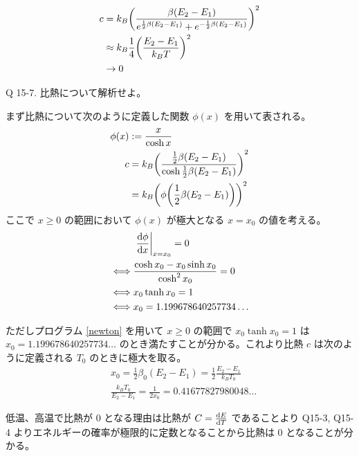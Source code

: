 \documentclass[uplatex,dvipdfmx,a4paper,11pt]{jlreq}
\theoremstyle{definition}
\begin{document}
\begin{align}
  c & = k_B\qty(\frac{\beta(E_2 - E_1)}{e^{\frac{1}{2}\beta(E_2 - E_1)} + e^{-\frac{1}{2}\beta(E_2 - E_1)}})^2                                                                                                                                                                                     \\
    & \approx k_B\frac{1}{4}\qty(\frac{E_2 - E_1}{k_BT})^2                                                                                                                                                                                                                                         \\
    & \to 0
\end{align}

\begin{itembox}[l]{Q 15-7.}
  比熱について解析せよ。
\end{itembox}

まず比熱について次のように定義した関数 $\phi(x)$ を用いて表される。
\begin{align}
  \phi(x) & := \frac{x}{\cosh x}                                                              \\
  c       & = k_B\qty(\frac{\frac{1}{2}\beta(E_2 - E_1)}{\cosh\frac{1}{2}\beta(E_2 - E_1)})^2 \\
          & = k_B\qty(\phi\qty(\frac{1}{2}\beta(E_2 - E_1)))^2
\end{align}
ここで $x\geq 0$ の範囲において $\phi(x)$ が極大となる $x = x_0$ の値を考える。
\begin{align}
       & \left.\dv{\phi}{x}\right|_{x = x_0} = 0          \\
  \iff & \frac{\cosh x_0 - x_0\sinh x_0}{\cosh^2 x_0} = 0 \\
  \iff & x_0\tanh x_0 = 1                                 \\
  \iff & x_0 = 1.199678640257734\ldots
\end{align}

ただしプログラム \ref{newton} を用いて $x\geq 0$ の範囲で $x_0\tanh x_0 = 1$ は $x_0 = 1.199678640257734\ldots$ のとき満たすことが分かる。これより比熱 $c$ は次のように定義される $T_0$ のときに極大を取る。
\begin{align}
   & x_0 = \frac{1}{2}\beta_0(E_2 - E_1) = \frac{1}{2}\frac{E_2 - E_1}{k_BT_0} \\
   & \frac{k_BT_0}{E_2 - E_1} = \frac{1}{2x_0} =  0.41677827980048\ldots
\end{align}

低温、高温で比熱が 0 となる理由は比熱が $C = \dv{E}{T}$ であることより Q15-3, Q15-4 よりエネルギーの確率が極限的に定数となることから比熱は 0 となることが分かる。
\end{document}
